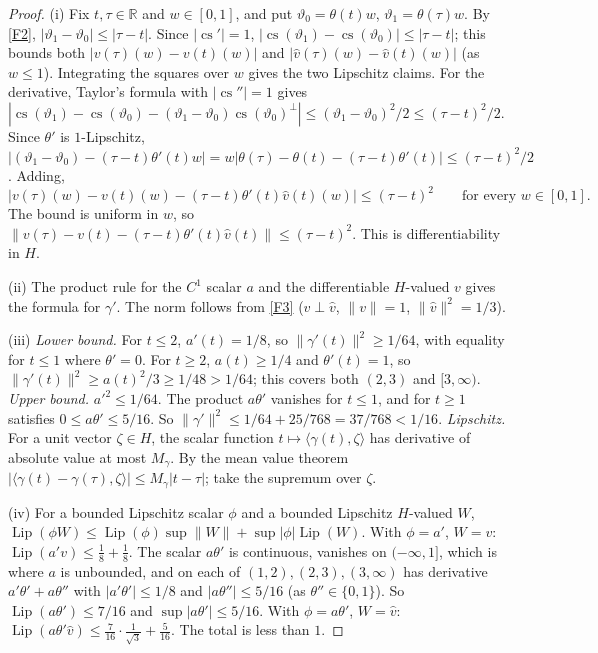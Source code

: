 \documentclass[11pt]{article}
\newcommand{\R}{\mathbb R}
\newcommand{\norm}[1]{\lVert #1\rVert}
\newcommand{\ip}[2]{\langle #1,#2\rangle}
\DeclareMathOperator{\Lip}{Lip}
\DeclareMathOperator{\cvec}{cs}
\theoremstyle{definition}
\numberwithin{equation}{section}
\begin{document}
\begin{proof}
(i) Fix \(t,\tau\in\R\) and \(w\in[0,1]\), and put
\(\vartheta_0=\theta(t)w\), \(\vartheta_1=\theta(\tau)w\). By \ref{F2},
\(|\vartheta_1-\vartheta_0|\le|\tau-t|\). Since \(|\cvec'|=1\),
\(|\cvec(\vartheta_1)-\cvec(\vartheta_0)|\le|\tau-t|\); this bounds both
\(|v(\tau)(w)-v(t)(w)|\) and \(|\hat v(\tau)(w)-\hat v(t)(w)|\) (as
\(w\le1\)). Integrating the squares over \(w\) gives the two Lipschitz claims.
For the derivative, Taylor's formula with \(|\cvec''|=1\) gives
\(|\cvec(\vartheta_1)-\cvec(\vartheta_0)
-(\vartheta_1-\vartheta_0)\cvec(\vartheta_0)^\perp|
\le(\vartheta_1-\vartheta_0)^2/2\le(\tau-t)^2/2\). Since \(\theta'\) is
\(1\)-Lipschitz,
\(|(\vartheta_1-\vartheta_0)-(\tau-t)\theta'(t)w|
=w|\theta(\tau)-\theta(t)-(\tau-t)\theta'(t)|\le(\tau-t)^2/2\). Adding,
\[
 \bigl|v(\tau)(w)-v(t)(w)-(\tau-t)\theta'(t)\hat v(t)(w)\bigr|\le(\tau-t)^2
 \qquad\text{for every }w\in[0,1].
\]
The bound is uniform in \(w\), so
\(\norm{v(\tau)-v(t)-(\tau-t)\theta'(t)\hat v(t)}\le(\tau-t)^2\). This is
differentiability in \(H\).

(ii) The product rule for the \(C^1\) scalar \(a\) and the differentiable
\(H\)-valued \(v\) gives the formula for \(\gamma'\). The norm follows from
\ref{F3} (\(v\perp\hat v\), \(\norm{v}=1\), \(\norm{\hat v}^2=1/3\)).

(iii) \emph{Lower bound.} For \(t\le2\), \(a'(t)=1/8\), so
\(\norm{\gamma'(t)}^2\ge1/64\), with equality for \(t\le1\) where
\(\theta'=0\). For \(t\ge2\), \(a(t)\ge1/4\) and \(\theta'(t)=1\), so
\(\norm{\gamma'(t)}^2\ge a(t)^2/3\ge1/48>1/64\); this covers both \((2,3)\)
and \([3,\infty)\). \emph{Upper bound.} \(a'^2\le1/64\). The product
\(a\theta'\) vanishes for \(t\le1\), and for \(t\ge1\) satisfies
\(0\le a\theta'\le5/16\). So
\(\norm{\gamma'}^2\le1/64+25/768=37/768<1/16\). \emph{Lipschitz.} For a unit
vector \(\zeta\in H\), the scalar function \(t\mapsto\ip{\gamma(t)}{\zeta}\)
has derivative of absolute value at most \(M_\gamma\). By the mean value
theorem \(|\ip{\gamma(t)-\gamma(\tau)}{\zeta}|\le M_\gamma|t-\tau|\); take the
supremum over \(\zeta\).

(iv) For a bounded Lipschitz scalar \(\phi\) and a bounded Lipschitz
\(H\)-valued \(W\),
\(\Lip(\phi W)\le\Lip(\phi)\sup\norm W+\sup|\phi|\Lip(W)\). With
\(\phi=a'\), \(W=v\): \(\Lip(a'v)\le\frac18+\frac18\). The scalar
\(a\theta'\) is continuous, vanishes on \((-\infty,1]\), which is where \(a\)
is unbounded, and on each of \((1,2),(2,3),(3,\infty)\) has derivative
\(a'\theta'+a\theta''\) with \(|a'\theta'|\le1/8\) and \(|a\theta''|\le5/16\)
(as \(\theta''\in\{0,1\}\)). So \(\Lip(a\theta')\le7/16\) and
\(\sup|a\theta'|\le5/16\). With \(\phi=a\theta'\), \(W=\hat v\):
\(\Lip(a\theta'\hat v)\le\frac7{16}\cdot\frac1{\sqrt3}+\frac5{16}\). The
total is less than \(1\).


\end{proof}
\end{document}
